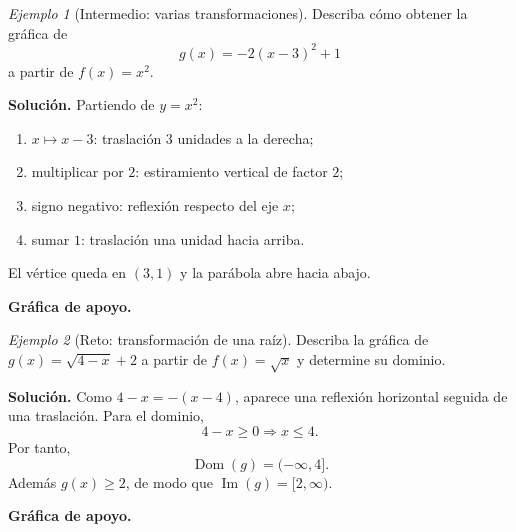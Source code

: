 \documentclass[12pt]{article}
\theoremstyle{remark}
\newtheorem{ejemplo}{Ejemplo}[section]
\newcommand{\Dom}{\operatorname{Dom}}
\newcommand{\Ima}{\operatorname{Im}}
\begin{document}
\begin{ejemplo}[Intermedio: varias transformaciones]
Describa cómo obtener la gráfica de
\[
g(x)=-2(x-3)^2+1
\]
a partir de $f(x)=x^2$.

\textbf{Solución.} Partiendo de $y=x^2$:
\begin{enumerate}
\item $x\mapsto x-3$: traslación $3$ unidades a la derecha;
\item multiplicar por $2$: estiramiento vertical de factor $2$;
\item signo negativo: reflexión respecto del eje $x$;
\item sumar $1$: traslación una unidad hacia arriba.
\end{enumerate}
El vértice queda en $(3,1)$ y la parábola abre hacia abajo.


\textbf{Gráfica de apoyo.}\medskip
\begin{center}
\end{center}

\end{ejemplo}

\begin{ejemplo}[Reto: transformación de una raíz]
Describa la gráfica de $g(x)=\sqrt{4-x}+2$ a partir de $f(x)=\sqrt{x}$ y determine su dominio.

\textbf{Solución.} Como $4-x=-(x-4)$, aparece una reflexión horizontal seguida de una traslación. Para el dominio,
\[
4-x\ge0\Longrightarrow x\le4.
\]
Por tanto,
\[
\boxed{\Dom(g)=(-\infty,4]}.
\]
Además $g(x)\ge2$, de modo que $\Ima(g)=[2,\infty)$.


\textbf{Gráfica de apoyo.}\medskip
\begin{center}
\end{center}

\end{ejemplo}
\end{document}
